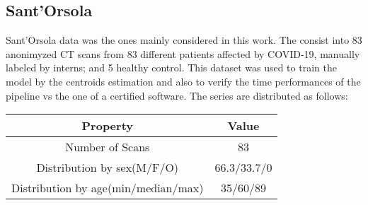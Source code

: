 \documentclass{standalone}
\begin{document}
	\subsection{Sant'Orsola}
	
	Sant'Orsola data was the ones mainly considered in this work. The consist into 83 anonimyzed CT scans from $83$ different patients affected by COVID-19, manually labeled by interns; and 5 healthy control. This dataset was used to train the model by the centroids estimation and also to verify the time performances of the pipeline vs the one of a certified software.
	The series are distributed as follows: 
	\begin{table}[h!]
		\centering
		\begin{tabular}{|c|c|}
			\hline
					\textbf{Property}   		&	\textbf{Value} \\ \hline
					Number of Scans 			& 83			   \\ 
			Distribution by sex(M/F/O)  		& 66.3/33.7/0    \\
			Distribution by age(min/median/max) & 35/60/89	\\ \hline
		\end{tabular}
	\end{table}

	
\end{document}
